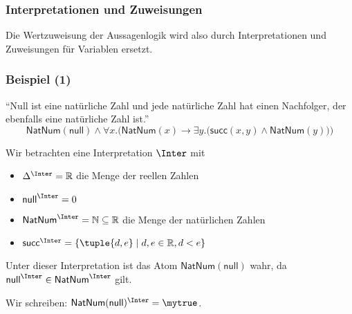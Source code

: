 \documentclass[aspectratio=1610,onlymath]{beamer}
\begin{document}
\begin{frame}\frametitle{Interpretationen und Zuweisungen}

Die Wertzuweisung der Aussagenlogik wird also durch \alert{Interpretationen}
und \alert{Zuweisungen} für Variablen ersetzt.
\smallskip



\end{frame}

\begin{frame}[t]\frametitle{Beispiel (1)}

\alert{"`Null ist eine natürliche Zahl und jede natürliche Zahl hat einen Nachfolger, der
ebenfalls eine natürliche Zahl ist."'}
\[ \textsf{NatNum}(\textsf{null})\wedge \forall x.\Big(\textsf{NatNum}(x)\to\exists y.\big(\textsf{succ}(x,y)\wedge \textsf{NatNum}(y)\big)\Big)\]

Wir betrachten eine Interpretation $\Inter$ mit
\begin{itemize}
\item $\Delta^\Inter=\mathbb{R}$ die Menge der reellen Zahlen
\item $\textsf{null}^\Inter=0$
\item $\textsf{NatNum}^\Inter=\mathbb{N}\subseteq\mathbb{R}$ die Menge der natürlichen Zahlen
\item $\textsf{succ}^\Inter=\{\tuple{d,e}\mid d,e\in\mathbb{R},d<e\}$
\end{itemize}

Unter dieser Interpretation ist das Atom $\textsf{NatNum}(\textsf{null})$ wahr, da
$\textsf{null}^\Inter\in\textsf{NatNum}^\Inter$ gilt.
\smallskip

Wir schreiben: $\textsf{NatNum}(\textsf{null})^\Inter=\mytrue$.

\end{frame}
\end{document}
